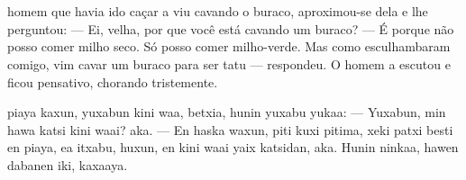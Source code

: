 \chapter*{}

\mbox{}\vspace*{\fill}



 homem que havia ido caçar a viu
cavando o buraco, aproximou-se
dela e lhe perguntou:\break
--- Ei, velha, por que você
está cavando um buraco?\break
--- É porque não posso comer milho seco.
Só posso 
comer milho-verde. 
Mas como esculhambaram comigo, vim cavar um
buraco para ser tatu --- respondeu.\break
O homem a escutou e ficou pensativo,
chorando tristemente.

\vspace{2em}

 piaya kaxun, yuxabun kini
waa, betxia, hunin yuxabu yukaa:\break
--- Yuxabun, min hawa
katsi kini waai? aka.\break
--- En haska waxun, piti kuxi
pitima, xeki patxi besti en piaya,
ea itxabu, huxun, en kini waai
yaix katsidan, aka.\break
Hunin ninkaa, hawen
dabanen iki, kaxaaya.

